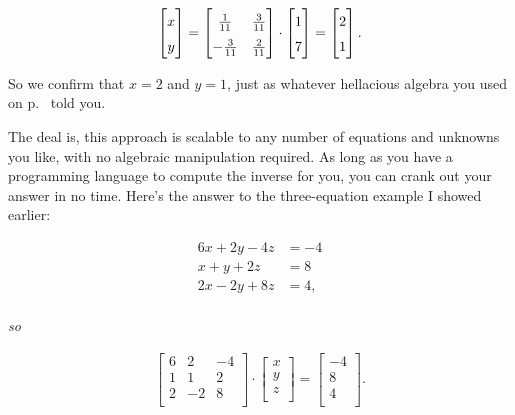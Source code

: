\vspace{-.15in}
\begin{align*}
\begin{bmatrix}
x \\ y \\
\end{bmatrix} =
\begingroup
\renewcommand*{\arraystretch}{1.5}
\begin{bmatrix}
\frac{1}{11} & \frac{3}{11} \\
-\frac{3}{11} & \frac{2}{11} \\
\end{bmatrix}
\endgroup
\cdot
\begin{bmatrix}
1 \\ 7 \\
\end{bmatrix} =
\begin{bmatrix}
2 \\ 1 \\
\end{bmatrix}.
\end{align*}
\vspace{-.15in}

So we confirm that $x=2$ and $y=1$, just as whatever hellacious algebra you
used on p.~\pageref{hellaciousAlgebra} told you.

\smallskip

The deal is, this approach is scalable to any number of equations and unknowns
you like, with no algebraic manipulation required. As long as you have a
programming language to compute the inverse for you, you can crank out your
answer in no time. Here's the answer to the three-equation example I showed
earlier:
\label{threeEqsThreeUnknownsSol}

\vspace{-.25in}
\begin{align*}
6x + 2y - 4z &= -4 \\
x + y + 2z &= 8 \\
2x - 2y + 8z &= 4, \\
\end{align*}
\vspace{-.65in}
\begin{center}
\textit{so} \\
\end{center}
\vspace{-.25in}
\begin{align*}
\begin{bmatrix}
6 & 2 & -4 \\
1 & 1 & 2 \\
2 & -2 & 8 \\
\end{bmatrix} \cdot 
\begin{bmatrix}
x \\ y \\ z \\
\end{bmatrix} =
\begin{bmatrix}
-4 \\ 8 \\ 4 \\
\end{bmatrix}.
\end{align*}
\vspace{-.25in}

